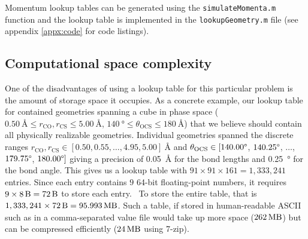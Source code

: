 
Momentum lookup tables can be generated using the \texttt{simulateMomenta.m} function and the lookup table is implemented in the \texttt{lookupGeometry.m} file (see appendix \ref{appx:code} for code listings).


\subsection{Computational space complexity} \label{ssec:LTspace}

One of the disadvantages of using a lookup table for this particular problem is the amount of storage space it occupies. As a concrete example, our lookup table for  contained geometries spanning a cube in phase space ($\SI{0.50}{\angstrom} \le r_\mathrm{CO}, r_\mathrm{CS} \le \SI{5.00}{\angstrom}$, $\SI{140}{\degree} \le \theta_\mathrm{OCS} \le \SI{180}{\angstrom}$) that we believe should contain all physically realizable geometries. Individual geometries spanned the discrete ranges $r_\mathrm{CO}, r_\mathrm{CS} \in [0.50, 0.55, \dots, 4.95, 5.00] \SI{}{\angstrom}$ and $\theta_\mathrm{OCS} \in [140.00\degree$, $140.25\degree$, $\dots$, $179.75\degree$, $180.00\degree]$ giving a precision of \SI{0.05}{\angstrom} for the bond lengths and \SI{0.25}{\degree} for the bond angle. This gives us a lookup table with $91 \times 91 \times 161 = 1,333,241$ entries. Since each entry contains $9$ 64-bit floating-point numbers, it requires $9 \times \SI{8}{\byte} = \SI{72}{\byte}$ to store each entry.\footnotemark~ To store the entire table, that is $1,333,241 \times \SI{72}{\byte} = \SI{95.993}{\mega\byte}$. Such a table, if stored in human-readable ASCII such as in a comma-separated value file would take up more space ($\SI{262}{\mega\byte}$) but can be compressed efficiently ($\SI{24}{\mega\byte}$ using 7-zip).

